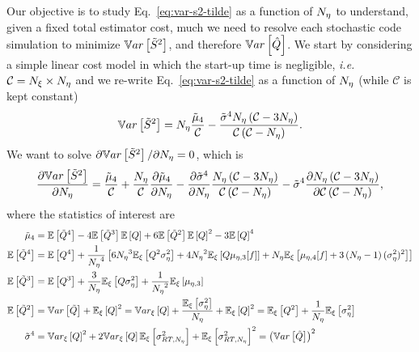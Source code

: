 Our objective is to study Eq.~\eqref{eq:var-s2-tilde} as a function of ${N_\eta}$ to understand, given a fixed total estimator cost, much we need to resolve each stochastic code simulation to minimize $\mathbb{V}ar\left[\tilde{S}^2\right]$, and therefore $\mathbb{V}ar\left[\hat{Q}\right]$. We start by considering a simple linear cost model in which the start-up time is negligible, \textit{i.e.} $\mathcal{C}={N_\xi} \times {N_\eta}$ and we re-write Eq.~\eqref{eq:var-s2-tilde} as a function of ${N_\eta}$ (while $\mathcal{C}$ is kept constant)
\begin{equation}\label{eq:var-s2-tilde-neta}
 \mathbb{V}ar\left[\tilde{S}^2\right] = {N_\eta} \frac{ \tilde{\mu}_4 }{ \mathcal{C} } - \frac{ \tilde{\sigma}^4 {N_\eta} \left( \mathcal{C} - 3 {N_\eta} \right) }{ \mathcal{C} \left( \mathcal{C} - {N_\eta} \right) }.
\end{equation}
We want to solve $\partial \mathbb{V}ar\left[\tilde{S}^2\right] / \partial {N_\eta} = 0$, which is
\begin{equation}\label{eq:dVar-dNeta}
 \frac{ \partial  \mathbb{V}ar\left[\tilde{S}^2\right]  }{ \partial  {N_\eta}  } = \frac{ \tilde{\mu}_4 }{ \mathcal{C} } + \frac{ {N_\eta} }{ \mathcal{C} } \frac{ \partial  \tilde{\mu}_4  }{ \partial  {N_\eta}  }
                                      - \frac{ \partial  \tilde{\sigma}^4  }{ \partial  {N_\eta}  } \frac{ {N_\eta} \left( \mathcal{C} - 3 {N_\eta} \right) }{ \mathcal{C} \left( \mathcal{C} - {N_\eta} \right) }
                                      - \tilde{\sigma}^4 \frac{ \partial  {N_\eta} \left( \mathcal{C} - 3 {N_\eta} \right)  }{ \partial  \mathcal{C} \left( \mathcal{C} - {N_\eta} \right)  },
\end{equation}
where the statistics of interest are  
\begin{equation} \label{eq:E_Q_tilde}
 \begin{split}
  \tilde{\mu}_{4} &= \mathbb{E}\left[ \tilde{Q}^4 \right] - 4 \mathbb{E}\left[ \tilde{Q}^3 \right] \mathbb{E}\left[ Q \right] + 6 \mathbb{E}\left[ \tilde{Q}^2 \right] \mathbb{E}\left[Q\right]^2 - 3 \mathbb{E}\left[ Q \right]^4   \\
  \mathbb{E}\left[\tilde{Q}^4\right] &= \mathbb{E}\left[ Q^4 \right] + \frac{1}{{N_\eta}^4} \left[ 6 {N_\eta}^3 \mathbb{E}_\xi\left[ Q^2 \sigma^2_\eta \right] + 4 {N_\eta}^2 \mathbb{E}_\xi\left[ Q \mu_{\eta,3}[f] \right] 
               + {N_\eta} \mathbb{E}_\xi\left[ \mu_{\eta,4}[f] + 3 \left( {N_\eta}-1 \right) (\sigma^2_\eta)^2\right] \right] \\
  \mathbb{E}\left[\tilde{Q}^3\right] &= \mathbb{E}\left[Q^3\right] + \frac{3}{{N_\eta}} \mathbb{E}_\xi\left[ Q \sigma^2_\eta \right] + \frac{1}{{N_\eta}^2} \mathbb{E}_\xi\left[ \mu_{\eta,3} \right] \\
  \mathbb{E}\left[\tilde{Q}^2\right] &= \mathbb{V}ar\left[\tilde{Q}\right] + \mathbb{E}_\xi\left[Q\right]^2 = \mathbb{V}ar_\xi\left[Q\right] + \frac{ \mathbb{E}_\xi\left[ \sigma^2_\eta \right] }{ {N_\eta} } + \mathbb{E}_\xi\left[Q\right]^2 = \mathbb{E}_\xi\left[Q^2\right] + \frac{1}{{N_\eta}}\mathbb{E}_\xi\left[\sigma^2_\eta\right]\\
   \tilde{\sigma}^4 &= \mathbb{V}ar_\xi\left[Q\right]^2 + 2 \mathbb{V}ar_\xi\left[Q\right] \mathbb{E}_\xi\left[ \sigma^2_{RT,{N_\eta}} \right] + \mathbb{E}_\xi\left[ \sigma^2_{RT,{N_\eta}} \right]^2 = \left( \mathbb{V}ar\left[ \tilde{Q} \right] \right)^2\\  
 \end{split}
\end{equation}
